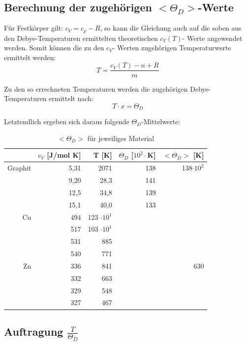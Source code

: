 \documentclass[12pt,a4paper,titlepage,headinclude,bibtotoc]{scrartcl}
\begin{document}
\FloatBarrier

\subsection{Berechnung der zugehörigen $<\Theta_D>$-Werte }


Für Festkörper gilt: $c_V =c_p -R$, so kann die Gleichung auch auf die soben aus den Debye-Temperaturen ermittelten theoretischen $c_V(T)$- Werte angewendet werden. Somit können die zu den $c_V$- Werten zugehörigen Temperaturwerte ermittelt werden:\\

\begin{equation}
T= \frac{c_V(T) -n +R}{m}
\end{equation}

Zu den so errechneten Temperaturen werden die zugehörigen Debye-Temperaturen ermittelt nach:\\

\begin{equation}
T \cdot x = \Theta_D
\end{equation}

Letztendlich ergeben sich daraus folgende $\Theta_D$-Mittelwerte:\\


\begin{table} [h]\caption{$<\Theta_D>$ für jeweiliges Material}
\begin{tabular} {r | r|  r |r |r}
& $c_V$ [J/mol K] & T	[K] &$\Theta_D$ [$10^2\cdot$K]	&$<\Theta_D>$ [K]\\
\hline
Graphit &5,31	&2071	&138&	138$\cdot10^2$\\
        &9,20	&28,3&	141\\	
        &12,5&	34,8&	139\\	
        &15,1	&40,0	&133\\
\hline						
Cu &494 &	123 $\cdot 10^1$\\
&517 &	103 $\cdot 10^1$\\
&531 &	885\\	
&540 &	771\\	
\hline		
Zn& 336&	841&	&630\\
&332 &	663\\	
&329&	548\\
&327&	467\\
\end{tabular}
\end{table}


\subsection{Auftragung $\frac{T}{\Theta_D}$}
\end{document}
